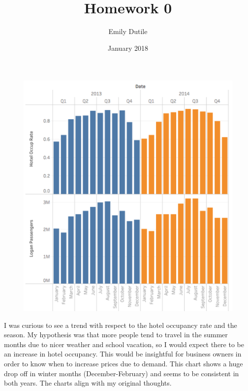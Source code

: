 \documentclass{neu_handout}
\title{Homework 0}
\author{Emily Dutile}
\date{January 2018}
\begin{document}
\begin{figure}[h]
\centering
{
\includegraphics[width=0.4\linewidth]{tableau}
}
\end{figure}

I was curious to see a trend with respect to the hotel occupancy rate and the season. My hypothesis was that more people tend to travel in the summer months due to nicer weather and school vacation, so I would expect there to be an increase in hotel occupancy. This would be insightful for business owners in order to know when to increase prices due to demand. This chart shows a huge drop off in winter months (December-February) and seems to be consistent in both years. The charts align with my original thoughts.
\end{document}
